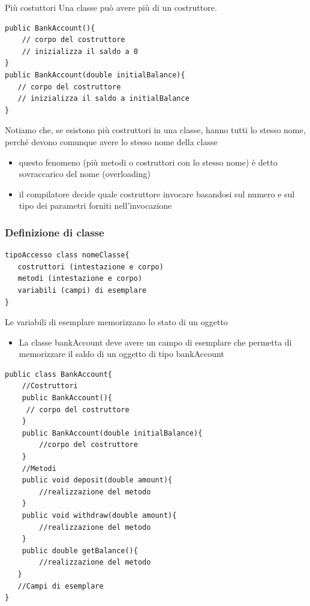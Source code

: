 \begin{frame}[fragile]
\begin{block}{Più costuttori}
Una classe può avere più di un costruttore.
\end{block}
\pause
\begin{lstlisting}
public BankAccount(){ 
    // corpo del costruttore
    // inizializza il saldo a 0
}
public BankAccount(double initialBalance){ 
   // corpo del costruttore
   // inizializza il saldo a initialBalance
}
\end{lstlisting}
\end{frame}
%
\begin{frame}
\begin{block}{}
Notiamo che, se esistono più costruttori in una classe, hanno tutti lo stesso nome, perché devono comunque avere lo 
stesso nome della classe
\begin{itemize}
\item questo fenomeno (più metodi o costruttori con lo stesso nome) è detto sovraccarico del nome (overloading)
\item il compilatore decide quale costruttore invocare basandosi sul numero e sul tipo dei parametri forniti
nell’invocazione
\end{itemize}
\end{block}
\end{frame}



\begin{frame}[fragile]
\frametitle{Definizione di classe}
\begin{lstlisting}
tipoAccesso class nomeClasse{ 
   costruttori (intestazione e corpo)
   metodi (intestazione e corpo)
   variabili (campi) di esemplare
}
\end{lstlisting}
\begin{block}{}
Le variabili di esemplare memorizzano lo stato di un oggetto 
\begin{itemize}
\item La classe bankAccount deve avere un campo di esemplare che permetta di memorizzare il saldo di un
oggetto di tipo bankAccount
\end{itemize}
\end{block}
\end{frame}

\begin{frame}[fragile]
\begin{lstlisting}
public class BankAccount{
    //Costruttori
    public BankAccount(){
     // corpo del costruttore 
    }
    public BankAccount(double initialBalance){ 
        //corpo del costruttore 
    }
    //Metodi
    public void deposit(double amount){ 
        //realizzazione del metodo 
    }
    public void withdraw(double amount){
        //realizzazione del metodo 
    }
    public double getBalance(){
        //realizzazione del metodo 
   }
   //Campi di esemplare
}
\end{lstlisting}
\end{frame}

